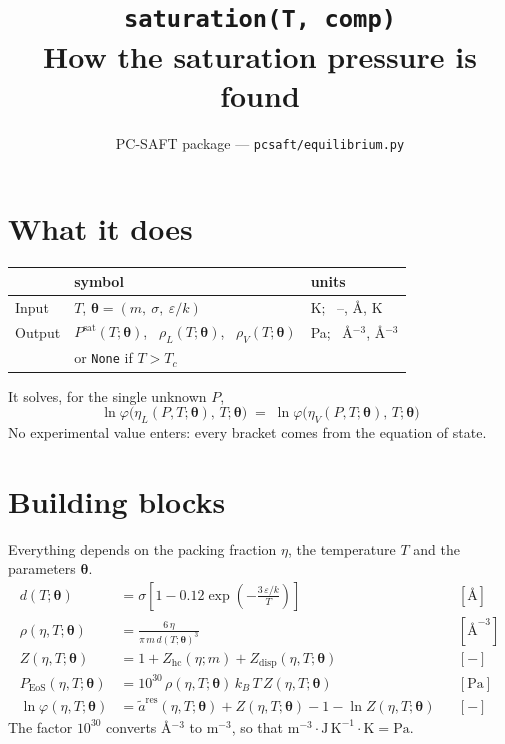 \documentclass[11pt]{article}
\title{\texttt{saturation(T, comp)}\\[2pt]\large How the saturation pressure is found}
\author{PC-SAFT package --- \texttt{pcsaft/equilibrium.py}}
\date{}
\newcommand{\pth}{\boldsymbol{\theta}}
\newcommand{\Peos}{P_{\mathrm{EoS}}}
\begin{document}
\maketitle

\section{What it does}

\begin{center}
\begin{tabular}{lll}
\toprule
 & symbol & units \\
\midrule
Input  & $T$, \quad $\pth = (m,\ \sigma,\ \varepsilon/k)$ & K; \ --, \AA, K \\
Output & $P^{\mathrm{sat}}(T;\pth)$, \ $\rho_L(T;\pth)$, \ $\rho_V(T;\pth)$ & Pa; \ \AA$^{-3}$, \AA$^{-3}$ \\
       & or \texttt{None} if $T > T_c$ & \\
\bottomrule
\end{tabular}
\end{center}

\noindent It solves, for the single unknown $P$,
\begin{equation}
\boxed{\;\ln\varphi\big(\eta_L(P,T;\pth),\,T;\pth\big) \;=\; \ln\varphi\big(\eta_V(P,T;\pth),\,T;\pth\big)\;}
\label{eq:goal}
\end{equation}
No experimental value enters: every bracket comes from the equation of state.

\section{Building blocks}

Everything depends on the packing fraction $\eta$, the temperature $T$ and the parameters $\pth$.
\begin{align}
d(T;\pth) &= \sigma\left[1 - 0.12\exp\!\left(-\frac{3\,\varepsilon/k}{T}\right)\right] && [\text{\AA}]\\[4pt]
\rho(\eta,T;\pth) &= \frac{6\,\eta}{\pi\, m\, d(T;\pth)^3} && [\text{\AA}^{-3}]\\[4pt]
Z(\eta,T;\pth) &= 1 + Z_{\mathrm{hc}}(\eta;m) + Z_{\mathrm{disp}}(\eta,T;\pth) && [-]\\[4pt]
\Peos(\eta,T;\pth) &= 10^{30}\,\rho(\eta,T;\pth)\,k_B\,T\,Z(\eta,T;\pth) && [\mathrm{Pa}]\\[4pt]
\ln\varphi(\eta,T;\pth) &= \tilde a^{\mathrm{res}}(\eta,T;\pth) + Z(\eta,T;\pth) - 1 - \ln Z(\eta,T;\pth) && [-]
\end{align}
The factor $10^{30}$ converts \AA$^{-3}$ to m$^{-3}$, so that $\mathrm{m^{-3}\cdot J\,K^{-1}\cdot K = Pa}$.
\end{document}
